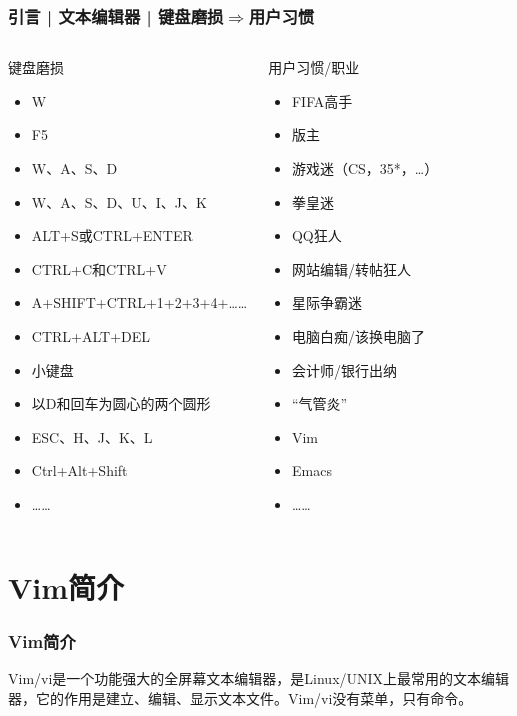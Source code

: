 \begin{frame}
  \frametitle{引言 | 文本编辑器 | 键盘磨损$\Rightarrow$用户习惯}
  \begin{columns}
  \begin{block}{键盘磨损}
    \begin{itemize}
      \item W
      \item F5
      \item W、A、S、D
      \item W、A、S、D、U、I、J、K
      \item ALT+S或CTRL+ENTER
      \item CTRL+C和CTRL+V
      \item A+SHIFT+CTRL+1+2+3+4+……
      \item CTRL+ALT+DEL
      \item 小键盘
      \item 以D和回车为圆心的两个圆形
      \item ESC、H、J、K、L
      \item Ctrl+Alt+Shift
      \item ……
    \end{itemize}
   \end{block}
   \pause
   \begin{block}{用户习惯/职业}
    \begin{itemize}
      \item FIFA高手
      \item 版主
      \item 游戏迷（CS，35*，…）
      \item 拳皇迷
      \item QQ狂人
      \item 网站编辑/转帖狂人
      \item 星际争霸迷
      \item 电脑白痴/该换电脑了
      \item 会计师/银行出纳
      \item “气管炎”
      \item Vim
      \item Emacs
      \item ……
    \end{itemize}
   \end{block}
 \end{columns}
\end{frame}

\section{Vim简介}
\begin{frame}
  \frametitle{Vim简介}
  Vim/vi是一个功能强大的全屏幕文本编辑器，是Linux/UNIX上最常用的文本编辑器，它的作用是建立、编辑、显示文本文件。Vim/vi没有菜单，只有命令。
\end{frame}

